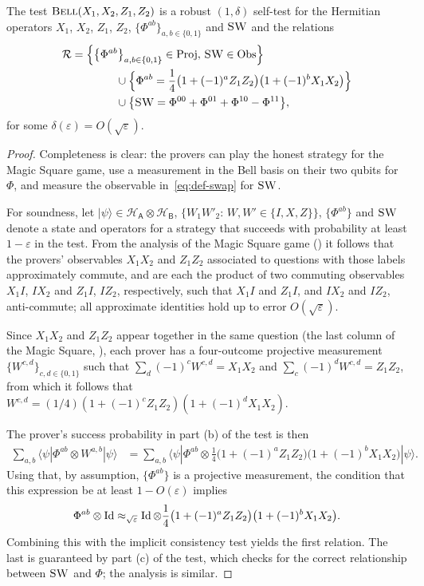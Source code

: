 \documentclass{toc}
\newcommand{\ket}[1]{|#1\rangle}
\newcommand{\bra}[1]{\langle#1|}
\newcommand{\Id}{\ensuremath{\mathop{\rm Id}\nolimits}}
\newcommand{\setft}[1]{\mathrm{#1}}
\newcommand{\Proj}{\setft{Proj}}
\newcommand{\Obs}{\setft{Obs}}
\newcommand{\reg}[1]{{\textsf{#1}}}
\newcommand{\mH}{\mathcal{H}}
\newcommand{\eps}{\varepsilon}
\newcommand{\bellt}{\textsc{Bell}}
\newcommand{\SWAP}{\textsc{SW}}
\begin{document}
\begin{lemma}\label{lem:bell-rigid-test}
The test $\bellt(X_1,X_2,Z_1,Z_2)$ is a robust $(1,\delta)$ self-test for
the %
Hermitian operators %
$X_1$, $X_2$, $Z_1$, $Z_2$,  %
$\{ \Phi^{ab}\}_{a,b\in\{0,1\}}$ and $\SWAP$ and the relations 
\begin{align*}
\mathcal{R}&= \Big\{\big\{\Phi^{ab}\big\}_{a,b\in\{0,1\}}\in\Proj,\,
  \SWAP\in\Obs\Big\}\\
  &\qquad\qquad\cup \Big\{\Phi^{ab} = \frac{1}{4}\big(1+(-1)^a Z_1Z_2\big)\big(1+(-1)^bX_1X_2\big) \Big\}\\
&\qquad\qquad \cup \big\{\SWAP = \Phi^{00}+\Phi^{01}+\Phi^{10}-\Phi^{11}\big\},
\end{align*}
 for some $\delta(\eps) = O(\sqrt{\eps})$.
\end{lemma}


\begin{proof}
Completeness is clear: the provers can play the honest strategy for the Magic Square game, use a measurement in the Bell basis on their two qubits for $\Phi$, and measure the  observable in~\eqref{eq:def-swap} for $\SWAP$. 

For soundness, let $\ket{\psi}\in\mH_\reg{A}\otimes \mH_\reg{B}$, $\{W_1W'_2:\, W,W'\in\{I,X,Z\}\}$, $\{\Phi^{ab}\}$ and $\SWAP$ denote a state and operators for a strategy that succeeds with probability at least $1-\eps$ in the test. From the analysis of the Magic Square game () it follows that the provers' observables $X_1X_2$ and $Z_1Z_2$ associated to questions with those  labels approximately commute, and are each the product of two commuting observables $X_1I$, $IX_2$ and $Z_1I$, $IZ_2$, %
 respectively, such that $X_1I$ and $Z_1I$, and $IX_2$ and $IZ_2$, anti-commute; all approximate identities hold up to error $O(\sqrt{\eps})$. 

Since $X_1X_2$ and $Z_1Z_2$ appear together in the same question (the last column of the Magic Square, ), each prover has a four-outcome projective measurement $\{W^{c,d}\}_{c,d\in\{0,1\}}$ such that $\sum_d (-1)^c W^{c,d} = X_1X_2$ and $\sum_c (-1)^dW^{c,d} = Z_1Z_2$, from which it follows that $W^{c,d} = (1/4)(1+(-1)^c Z_1Z_2)(1+(-1)^d X_1X_2)$. 

The prover's success probability in part (b) of the test is then
\begin{align*}
\sum_{a,b} \bra{\psi} \Phi^{ab} \otimes W^{a,b} \ket{\psi} &= \sum_{a,b} \bra{\psi} \Phi^{ab} \otimes \frac{1}{4} \big(1+(-1)^a Z_1Z_2\big)\big(1+(-1)^bX_1X_2\big) \ket{\psi}.
\end{align*}
Using that, by assumption, $\{\Phi^{ab}\}$ is a projective measurement, the condition that this expression be at least $1-O(\eps)$ implies 
$$\Phi^{ab} \otimes \Id \approx_{\sqrt{\eps}}\Id \otimes \frac{1}{4}\big(1+(-1)^a Z_1Z_2\big)\big(1+(-1)^bX_1X_2\big).$$ 
Combining this with the implicit consistency test yields the first relation. The last is guaranteed by part (c) of the test, which checks for the correct relationship between $\SWAP$ and $\Phi$; the analysis is similar.  
\end{proof}
\end{document}
